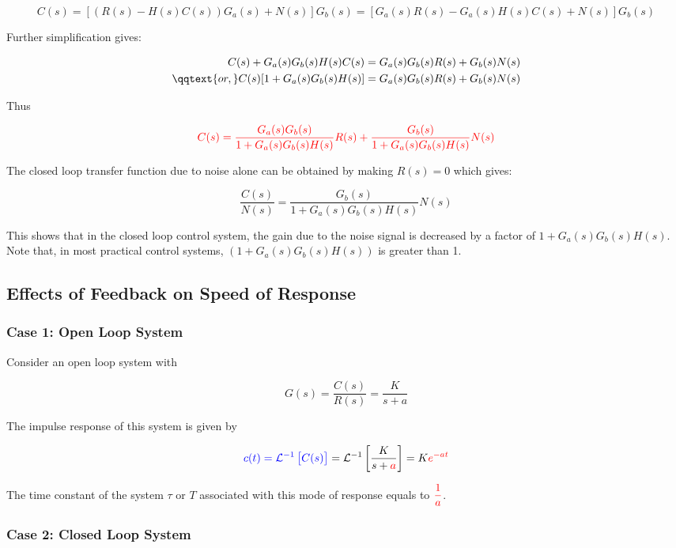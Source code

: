\documentclass[
  14pt,
  a4paper,
  oneside,
  open=any,
  a4paper,
  14pt]{report}
\begin{document}
\[
    C(s) = [(R(s) - H(s)C(s))G_a(s) + N(s)]G_b(s) = [G_a(s)R(s) - G_a(s)H(s)C(s) + N(s)]G_b(s)
\]

Further simplification gives:

\[
\begin{aligned}
    C(s) + G_a(s)G_b(s)H(s)C(s) &= G_a(s)G_b(s)R(s) + G_b(s)N(s) \\
\qqtext{or,}  C(s)[1+G_a(s)G_b(s)H(s)] &= G_a(s)G_b(s)R(s) + G_b(s)N(s)
\end{aligned}
\]

Thus

\[
    \textcolor{red}{C(s) = \dfrac{G_a(s)G_b(s)}{1+G_a(s)G_b(s)H(s)}R(s) + \dfrac{G_b(s)}{1+G_a(s)G_b(s)H(s)}N(s)}
\]

The closed loop transfer function due to noise alone can be obtained by
making \(R(s) = 0\) which gives:

\[
    \dfrac{C(s)}{N(s)} = \dfrac{G_b(s)}{1+G_a(s)G_b(s)H(s)} N(s)
\]

This shows that in the closed loop control system, the gain due to the
noise signal is decreased by a factor of \(1+G_a(s)G_b(s)H(s)\). Note
that, in most practical control systems, \((1+G_a(s)G_b(s)H(s))\) is
greater than 1.

\subsection{Effects of Feedback on Speed of
Response}\label{effects-of-feedback-on-speed-of-response}

\subsubsection{Case 1: Open Loop System}\label{case-1-open-loop-system}

Consider an open loop system with

\[
    G(s) = \dfrac{C(s)}{R(s)} = \dfrac{K}{s+a}
\]

The impulse response of this system is given by

\[  
    \textcolor{blue}{c(t) = \mathcal{L}^{-1}\left[C(s)\right]} = \mathcal{L}^{-1}\left[\dfrac{K}{s+\textcolor{red}{a}}\right] = K\textcolor{red}{e^{-at}}
\]

The time constant of the system \(\tau\) or \(T\) associated with this
mode of response equals to \(\textcolor{red}{\dfrac{1}{a}}\).

\subsubsection{Case 2: Closed Loop
System}\label{case-2-closed-loop-system}
\end{document}
